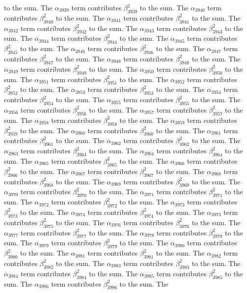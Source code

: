 \begin{lemma}
to the sum. The $\alpha_{3939}$ term contributes $\beta_{3939}^{2}$ to the sum. The $\alpha_{3940}$ term contributes $\beta_{3940}^{2}$ to the sum. The $\alpha_{3941}$ term contributes $\beta_{3941}^{2}$ to the sum. The $\alpha_{3942}$ term contributes $\beta_{3942}^{2}$ to the sum. The $\alpha_{3943}$ term contributes $\beta_{3943}^{2}$ to the sum. The $\alpha_{3944}$ term contributes $\beta_{3944}^{2}$ to the sum. The $\alpha_{3945}$ term contributes $\beta_{3945}^{2}$ to the sum. The $\alpha_{3946}$ term contributes $\beta_{3946}^{2}$ to the sum. The $\alpha_{3947}$ term contributes $\beta_{3947}^{2}$ to the sum. The $\alpha_{3948}$ term contributes $\beta_{3948}^{2}$ to the sum. The $\alpha_{3949}$ term contributes $\beta_{3949}^{2}$ to the sum. The $\alpha_{3950}$ term contributes $\beta_{3950}^{2}$ to the sum. The $\alpha_{3951}$ term contributes $\beta_{3951}^{2}$ to the sum. The $\alpha_{3952}$ term contributes $\beta_{3952}^{2}$ to the sum. The $\alpha_{3953}$ term contributes $\beta_{3953}^{2}$ to the sum. The $\alpha_{3954}$ term contributes $\beta_{3954}^{2}$ to the sum. The $\alpha_{3955}$ term contributes $\beta_{3955}^{2}$ to the sum. The $\alpha_{3956}$ term contributes $\beta_{3956}^{2}$ to the sum. The $\alpha_{3957}$ term contributes $\beta_{3957}^{2}$ to the sum. The $\alpha_{3958}$ term contributes $\beta_{3958}^{2}$ to the sum. The $\alpha_{3959}$ term contributes $\beta_{3959}^{2}$ to the sum. The $\alpha_{3960}$ term contributes $\beta_{3960}^{2}$ to the sum. The $\alpha_{3961}$ term contributes $\beta_{3961}^{2}$ to the sum. The $\alpha_{3962}$ term contributes $\beta_{3962}^{2}$ to the sum. The $\alpha_{3963}$ term contributes $\beta_{3963}^{2}$ to the sum. The $\alpha_{3964}$ term contributes $\beta_{3964}^{2}$ to the sum. The $\alpha_{3965}$ term contributes $\beta_{3965}^{2}$ to the sum. The $\alpha_{3966}$ term contributes $\beta_{3966}^{2}$ to the sum. The $\alpha_{3967}$ term contributes $\beta_{3967}^{2}$ to the sum. The $\alpha_{3968}$ term contributes $\beta_{3968}^{2}$ to the sum. The $\alpha_{3969}$ term contributes $\beta_{3969}^{2}$ to the sum. The $\alpha_{3970}$ term contributes $\beta_{3970}^{2}$ to the sum. The $\alpha_{3971}$ term contributes $\beta_{3971}^{2}$ to the sum. The $\alpha_{3972}$ term contributes $\beta_{3972}^{2}$ to the sum. The $\alpha_{3973}$ term contributes $\beta_{3973}^{2}$ to the sum. The $\alpha_{3974}$ term contributes $\beta_{3974}^{2}$ to the sum. The $\alpha_{3975}$ term contributes $\beta_{3975}^{2}$ to the sum. The $\alpha_{3976}$ term contributes $\beta_{3976}^{2}$ to the sum. The $\alpha_{3977}$ term contributes $\beta_{3977}^{2}$ to the sum. The $\alpha_{3978}$ term contributes $\beta_{3978}^{2}$ to the sum. The $\alpha_{3979}$ term contributes $\beta_{3979}^{2}$ to the sum. The $\alpha_{3980}$ term contributes $\beta_{3980}^{2}$ to the sum. The $\alpha_{3981}$ term contributes $\beta_{3981}^{2}$ to the sum. The $\alpha_{3982}$ term contributes $\beta_{3982}^{2}$ to the sum. The $\alpha_{3983}$ term contributes $\beta_{3983}^{2}$ to the sum. The $\alpha_{3984}$ term contributes $\beta_{3984}^{2}$ to the sum. The $\alpha_{3985}$ term contributes $\beta_{3985}^{2}$ to the sum. The $\alpha_{3986}$ term contributes $\beta_{3986}^{2}$ to the sum. The 
\end{lemma}
